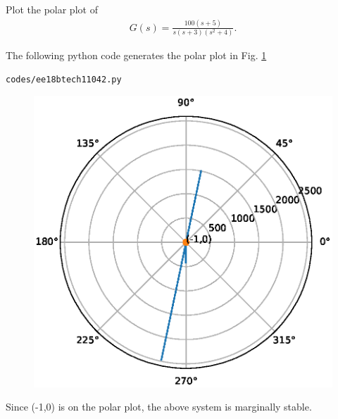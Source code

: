 \item Plot the polar plot of 
\begin{align}
G(s) = \frac{100(s+5)}{s(s+3)(s^2+4)}. 
\end{align}

\solution
The following python code generates the polar plot in Fig.   \ref{fig:ee18btech11042_polarplot}

\begin{lstlisting}
codes/ee18btech11042.py
\end{lstlisting}

\begin{figure}[!ht]
\centering
  \includegraphics[width=\columnwidth]{./figs/ee18btech11042.eps}
\caption{}
  \label{fig:ee18btech11042_polarplot}
\end{figure}

Since (-1,0) is on the  polar plot, the  above system is  marginally stable.



